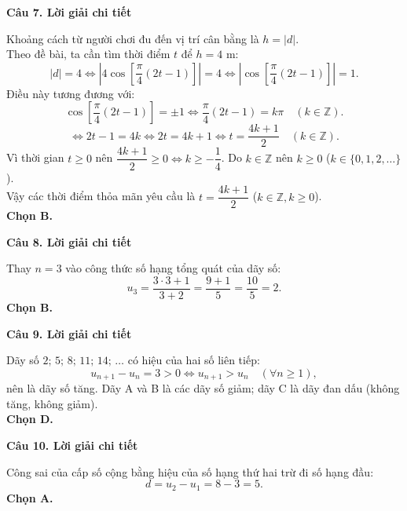 \documentclass[12pt, a4paper]{article}
\begin{document}
\noindent\textbf{Câu 7. Lời giải chi tiết}\par
\begin{tcolorbox}[enhanced,breakable,colback=solutionbg,colframe=secondary!50!black,frame hidden,borderline west={3pt}{0pt}{secondary!50!black}]
Khoảng cách từ người chơi đu đến vị trí cân bằng là $h = |d|$.\\
Theo đề bài, ta cần tìm thời điểm $t$ để $h = 4\text{ m}$:
$$|d| = 4 \Leftrightarrow \left|4\cos\left[\dfrac{\pi}{4}(2t - 1)\right]\right| = 4 \Leftrightarrow \left|\cos\left[\dfrac{\pi}{4}(2t - 1)\right]\right| = 1.$$
Điều này tương đương với:
$$\cos\left[\dfrac{\pi}{4}(2t - 1)\right] = \pm 1 \Leftrightarrow \dfrac{\pi}{4}(2t - 1) = k\pi\quad (k\in\mathbb{Z}).$$
$$\Leftrightarrow 2t - 1 = 4k \Leftrightarrow 2t = 4k + 1 \Leftrightarrow t = \dfrac{4k + 1}{2}\quad (k\in\mathbb{Z}).$$
Vì thời gian $t \ge 0$ nên $\dfrac{4k+1}{2} \ge 0 \Leftrightarrow k \ge -\dfrac{1}{4}$. Do $k \in \mathbb{Z}$ nên $k \ge 0$ ($k \in \{0, 1, 2, \dots\}$).\\
Vậy các thời điểm thỏa mãn yêu cầu là $t = \dfrac{4k+1}{2}$ ($k \in \mathbb{Z}, k \ge 0$).\\
\textbf{Chọn B.}
\end{tcolorbox}

\noindent\textbf{Câu 8. Lời giải chi tiết}\par
\begin{tcolorbox}[enhanced,breakable,colback=solutionbg,colframe=secondary!50!black,frame hidden,borderline west={3pt}{0pt}{secondary!50!black}]
Thay $n = 3$ vào công thức số hạng tổng quát của dãy số:
$$u_3 = \dfrac{3\cdot 3 + 1}{3 + 2} = \dfrac{9 + 1}{5} = \dfrac{10}{5} = 2.$$
\textbf{Chọn B.}
\end{tcolorbox}

\noindent\textbf{Câu 9. Lời giải chi tiết}\par
\begin{tcolorbox}[enhanced,breakable,colback=solutionbg,colframe=secondary!50!black,frame hidden,borderline west={3pt}{0pt}{secondary!50!black}]
Dãy số $2;\, 5;\, 8;\, 11;\, 14;\,\dots$ có hiệu của hai số liên tiếp:
$$u_{n+1} - u_n = 3 > 0 \Leftrightarrow u_{n+1} > u_n\quad (\forall n \ge 1),$$
nên là dãy số tăng. Dãy A và B là các dãy số giảm; dãy C là dãy đan dấu (không tăng, không giảm).\\
\textbf{Chọn D.}
\end{tcolorbox}

\noindent\textbf{Câu 10. Lời giải chi tiết}\par
\begin{tcolorbox}[enhanced,breakable,colback=solutionbg,colframe=secondary!50!black,frame hidden,borderline west={3pt}{0pt}{secondary!50!black}]
Công sai của cấp số cộng bằng hiệu của số hạng thứ hai trừ đi số hạng đầu:
$$d = u_2 - u_1 = 8 - 3 = 5.$$
\textbf{Chọn A.}
\end{tcolorbox}
\end{document}
